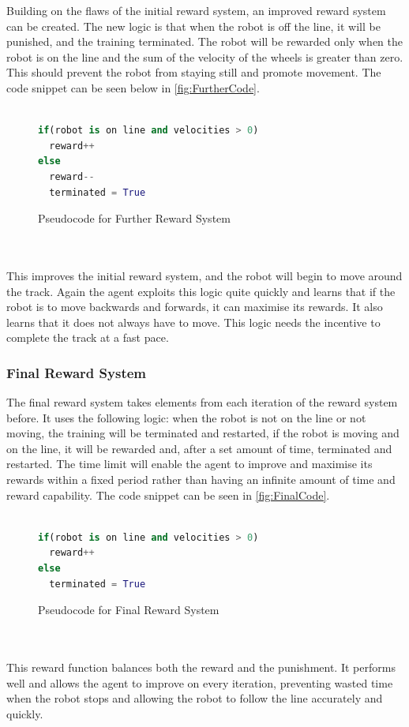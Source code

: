 \documentclass[a4paper,12pt]{article}
\begin{document}
Building on the flaws of the initial reward system, an improved reward system can be created. The new logic is that when the robot is off the line, it will be punished, and the training terminated. The robot will be rewarded only when the robot is on the line and the sum of the velocity of the wheels is greater than zero. This should prevent the robot from staying still and promote movement. The code snippet can be seen below in \autoref{fig:FurtherCode}.
\\\\
\begin{figure}[H]
\begin{lstlisting}[language=Python]
if(robot is on line and velocities > 0)
  reward++
else
  reward--
  terminated = True
\end{lstlisting}
\caption{Pseudocode for Further Reward System}
\label{fig:FurtherCode}
\end{figure}
\\\\
This improves the initial reward system, and the robot will begin to move around the track. Again the agent exploits this logic quite quickly and learns that if the robot is to move backwards and forwards, it can maximise its rewards. It also learns that it does not always have to move. This logic needs the incentive to complete the track at a fast pace.


\subsubsection{Final Reward System} 

The final reward system takes elements from each iteration of the reward system before. It uses the following logic: when the robot is not on the line or not moving, the training will be terminated and restarted, if the robot is moving and on the line, it will be rewarded and, after a set amount of time, terminated and restarted. The time limit will enable the agent to improve and maximise its rewards within a fixed period rather than having an infinite amount of time and reward capability. The code snippet can be seen in \autoref{fig:FinalCode}.
\\\\
\begin{figure}[H]
\begin{lstlisting}[language=Python]
if(robot is on line and velocities > 0)
  reward++
else
  terminated = True
\end{lstlisting}
\caption{Pseudocode for Final Reward System}
\label{fig:FinalCode}
\end{figure}
\\\\
This reward function balances both the reward and the punishment. It performs well and allows the agent to improve on every iteration, preventing wasted time when the robot stops and allowing the robot to follow the line accurately and quickly.
\end{document}
